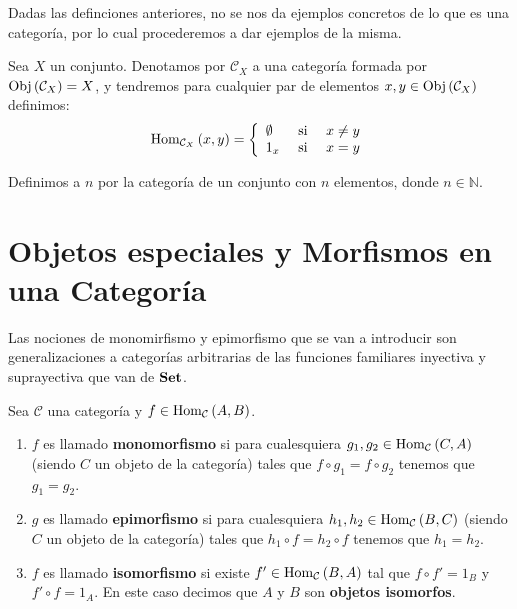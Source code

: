 \documentclass[12pt]{report}
\theoremstyle{largebreak}
\newcommand{\Obj}[1]{\ensuremath{\textup{Obj}\left(#1\right)}}
\newcommand{\Hom}[3]{\ensuremath{\textup{Hom}_{#1}\left(#2,#3\right)}}
\newcommand{\Cat}[1]{\ensuremath{\textup{\textbf{#1}}}}
\begin{document}
    Dadas las definciones anteriores, no se nos da ejemplos concretos de lo que es una categoría, por lo cual procederemos a dar ejemplos de la misma.

    \begin{exa}
        Sea $X$ un conjunto. Denotamos por $\mathcal{C}_X$ a una categoría formada por $\Obj{\mathcal{C}_X}=X$, y tendremos para cualquier par de elementos $x,y\in\Obj{\mathcal{C}_X}$ definimos:
        \begin{equation*}
            \Hom{\mathcal{C}_X}{x}{y}=\left\{
                \begin{array}{lcr}
                    \emptyset & \textup{ si } & x\neq y\\
                    1_x & \textup{ si } & x=y\\
                \end{array}
            \right.
        \end{equation*}
    \end{exa}

    \begin{exa}
        Definimos a $n$ por la categoría de un conjunto con $n$ elementos, donde $n\in\mathbb{N}$.
    \end{exa}
    
    \section{Objetos especiales y Morfismos en una Categoría}

    Las nociones de monomirfismo y epimorfismo que se van a introducir son generalizaciones a categorías arbitrarias de las funciones familiares inyectiva y suprayectiva que van de $\Cat{Set}$.

    \begin{mydef}
        Sea $\mathcal{C}$ una categoría y $f\in\Hom{\mathcal{C}}{A}{B}$.
        \begin{enumerate}
            \item $f$ es llamado \textbf{monomorfismo} si para cualesquiera $g_1,g_2\in\Hom{\mathcal{C}}{C}{A}$ (siendo $C$ un objeto de la categoría) tales que $f\circ g_1=f\circ g_2$ tenemos que $g_1=g_2$.
            \item $g$ es llamado \textbf{epimorfismo} si para cualesquiera $h_1,h_2\in\Hom{\mathcal{C}}{B}{C}$ (siendo $C$ un objeto de la categoría) tales que $h_1\circ f=h_2\circ f$ tenemos que $h_1=h_2$.
            \item $f$ es llamado \textbf{isomorfismo} si existe $f'\in\Hom{\mathcal{C}}{B}{A}$ tal que $f\circ f'=1_B$ y $f'\circ f=1_A$. En este caso decimos que $A$ y $B$ son \textbf{objetos isomorfos}.
        \end{enumerate}
    \end{mydef}
\end{document}
